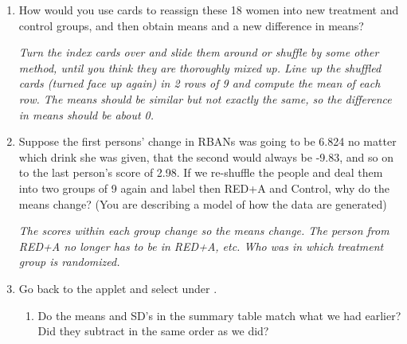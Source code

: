 \begin{enumerate}
\begin{key}
  {\it   Random variation}
\end{key}


\item  How would you use cards to reassign these 18 women into new
  treatment and control groups, and then obtain means and a new
  difference in means?
\begin{students}
    \vspace{3cm}    
\end{students}

\begin{key}
  {\it Turn the index cards over and slide them around or shuffle by
  some other method, until you think they are thoroughly mixed up.
  Line up the shuffled cards (turned face up again) in 2 rows of 9 and
  compute the mean of each row.   The means should be similar but not
  exactly the same, so the  difference in means should be about 0.}
\end{key}


\item  Suppose the first persons' change in RBANs was going to be
  6.824 no matter which drink she was given, that the second would
  always be -9.83, and so on to the last person's score of 2.98.  If
  we re-shuffle the people and deal them into two groups of 9 again
  and label then  RED+A and Control, why do the means change? (You
  are describing a model of how the data are generated) 
\begin{students}
    \vspace{2.5cm}    
\end{students}

\begin{key}
  {\it     The scores within each group change so the means change.  The person
  from RED+A no longer has to be in RED+A, etc.  Who was in which
  treatment group is randomized. 
}
\end{key}


 \item  Go back to the applet and select  under .
   \begin{enumerate}
   \item 
   Do the means and SD's in the summary table match what we had
   earlier?  Did they subtract in the same order as we did?
\begin{students}
    \vspace{1cm}    
\end{students}


\end{enumerate}
\end{enumerate}
